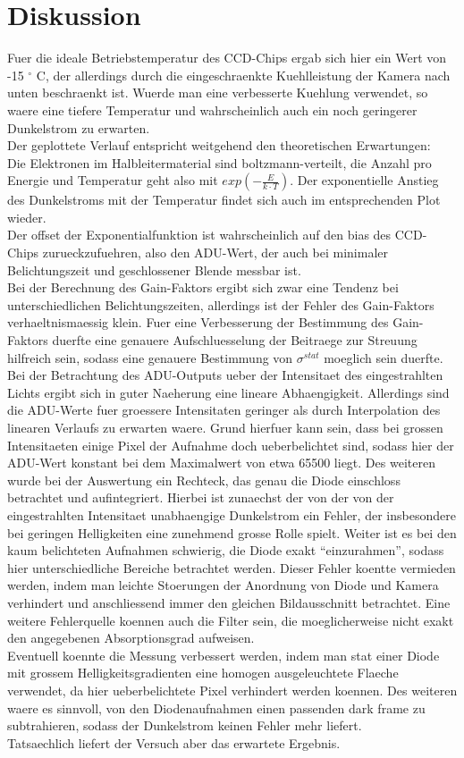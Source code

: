 \section{Diskussion}
Fuer die ideale Betriebstemperatur des CCD-Chips ergab sich hier ein Wert von -15 $^\circ$ C, der allerdings durch die eingeschraenkte Kuehlleistung der Kamera nach unten beschraenkt ist. Wuerde man eine verbesserte Kuehlung verwendet, so waere eine tiefere Temperatur und wahrscheinlich auch ein noch geringerer Dunkelstrom zu erwarten. \\
Der geplottete Verlauf entspricht weitgehend den theoretischen Erwartungen: \\
Die Elektronen im Halbleitermaterial sind boltzmann-verteilt, die Anzahl pro Energie und Temperatur geht also mit $exp(-\frac{E}{k \cdot T})$. Der exponentielle Anstieg des Dunkelstroms mit der Temperatur findet sich auch im entsprechenden Plot wieder. \\
Der offset der Exponentialfunktion ist wahrscheinlich auf den bias des CCD-Chips zurueckzufuehren, also den ADU-Wert, der auch bei minimaler Belichtungszeit und geschlossener Blende messbar ist. \\
Bei der Berechnung des Gain-Faktors ergibt sich zwar eine Tendenz bei unterschiedlichen Belichtungszeiten, allerdings ist der Fehler des Gain-Faktors verhaeltnismaessig klein. Fuer eine Verbesserung der Bestimmung des Gain-Faktors duerfte eine genauere Aufschluesselung der Beitraege zur Streuung hilfreich sein, sodass eine genauere Bestimmung von $\sigma^{stat}$ moeglich sein duerfte. \\
Bei der Betrachtung des ADU-Outputs ueber der Intensitaet des eingestrahlten Lichts ergibt sich in guter Naeherung eine lineare Abhaengigkeit. Allerdings sind die ADU-Werte fuer groessere Intensitaten geringer als durch Interpolation des linearen Verlaufs zu erwarten waere. Grund hierfuer kann sein, dass bei grossen Intensitaeten einige Pixel der Aufnahme doch ueberbelichtet sind, sodass hier der ADU-Wert konstant bei dem Maximalwert von etwa 65500 liegt. Des weiteren wurde bei der Auswertung ein Rechteck, das genau die Diode einschloss betrachtet und aufintegriert. Hierbei ist zunaechst der von der von der eingestrahlten Intensitaet unabhaengige Dunkelstrom ein Fehler, der insbesondere bei geringen Helligkeiten eine zunehmend grosse Rolle spielt. Weiter ist es bei den kaum belichteten Aufnahmen schwierig, die Diode exakt \enquote{einzurahmen}, sodass hier unterschiedliche Bereiche betrachtet werden. Dieser Fehler koentte vermieden werden, indem man leichte Stoerungen der Anordnung von Diode und Kamera verhindert und anschliessend immer den gleichen Bildausschnitt betrachtet. Eine weitere Fehlerquelle koennen auch die Filter sein, die moeglicherweise nicht exakt den angegebenen Absorptionsgrad aufweisen. \\
Eventuell koennte die Messung verbessert werden, indem man stat einer Diode mit grossem Helligkeitsgradienten eine homogen ausgeleuchtete Flaeche verwendet, da hier ueberbelichtete Pixel verhindert werden koennen. Des weiteren waere es sinnvoll, von den Diodenaufnahmen einen passenden dark frame zu subtrahieren, sodass der Dunkelstrom keinen Fehler mehr liefert. \\
Tatsaechlich liefert der Versuch aber das erwartete Ergebnis. 